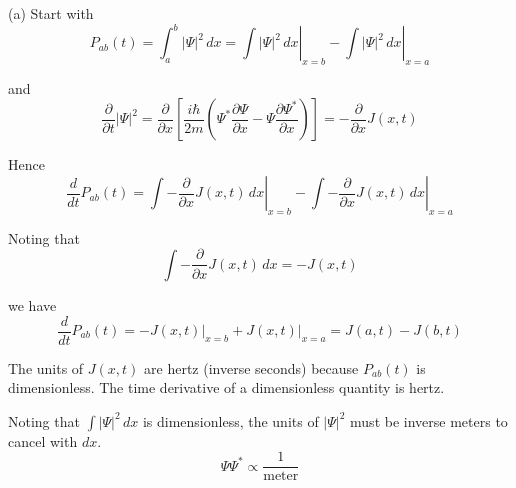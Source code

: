 


(a) Start with
\begin{equation*}
P_{ab}(t)=\int_a^b|\Psi|^2\,dx
=\left.\int|\Psi|^2\,dx\right|_{x=b}
-\left.\int|\Psi|^2\,dx\right|_{x=a}
\end{equation*}

and
\begin{equation*}
\frac{\partial}{\partial t}|\Psi|^2=\frac{\partial}{\partial x}
\left[
\frac{i\hbar}{2m}
\left(\Psi^*\frac{\partial\Psi}{\partial x}-\Psi\frac{\partial\Psi^*}{\partial x}\right)
\right]
=-\frac{\partial}{\partial x}J(x,t)
\end{equation*}

Hence
\begin{equation*}
\frac{d}{dt}P_{ab}(t)
=\left.\int-\frac{\partial}{\partial x}J(x,t)\,dx\right|_{x=b}
-\left.\int-\frac{\partial}{\partial x}J(x,t)\,dx\right|_{x=a}
\end{equation*}

Noting that
\begin{equation*}
\int-\frac{\partial}{\partial x}J(x,t)\,dx
=-J(x,t)
\end{equation*}

we have
\begin{equation*}
\frac{d}{dt}P_{ab}(t)
=-J(x,t)\bigg|_{x=b}+J(x,t)\bigg|_{x=a}
=J(a,t)-J(b,t)
\end{equation*}

The units of $J(x,t)$ are hertz (inverse seconds) because $P_{ab}(t)$ is dimensionless.
The time derivative of a dimensionless quantity is hertz.

\bigskip
Noting that $\int|\Psi|^2\,dx$ is dimensionless, the units of $|\Psi|^2$ must be inverse meters
to cancel with $dx$.
\begin{equation*}
\Psi\Psi^*\propto\frac{1}{\text{meter}}
\end{equation*}

